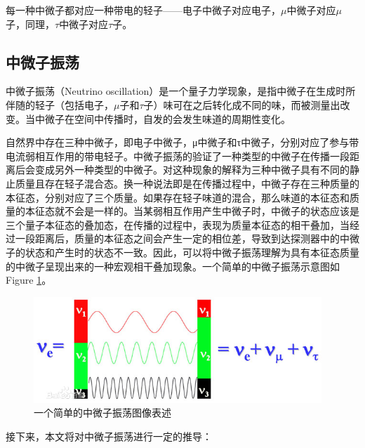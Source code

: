 \documentclass[10pt,a4paper]{article}
\begin{document}
每一种中微子都对应一种带电的轻子——电子中微子对应电子，$\mu$中微子对应$\mu$子，同理，$\tau$中微子对应$\tau$子。

\newpage

\subsection{中微子振荡}\label{sub:sysover}


中微子振荡（Neutrino oscillation）是一个量子力学现象，是指中微子在生成时所伴随的轻子（包括电子，$\mu$子和$\tau$子）味可在之后转化成不同的味，而被测量出改变。当中微子在空间中传播时，自发的会发生味道的周期性变化。

自然界中存在三种中微子，即电子中微子，μ中微子和τ中微子，分别对应了参与带电流弱相互作用的带电轻子。中微子振荡的验证了一种类型的中微子在传播一段距离后会变成另外一种类型的中微子。对这种现象的解释为三种中微子具有不同的静止质量且存在轻子混合态。换一种说法即是在传播过程中，中微子存在三种质量的本征态，分别对应了三个质量。如果存在轻子味道的混合，那么味道的本征态和质量的本征态就不会是一样的。当某弱相互作用产生中微子时，中微子的状态应该是三个量子本征态的叠加态，在传播的过程中，表现为质量本征态的相干叠加，当经过一段距离后，质量的本征态之间会产生一定的相位差，导致到达探测器中的中微子的状态和产生时的状态不一致。因此，可以将中微子振荡理解为具有本征态质量的中微子呈现出来的一种宏观相干叠加现象。一个简单的中微子振荡示意图如Figure \ref{fig:10}。


\begin{figure}[H]
 \centering
 \includegraphics[height=4cm]{images/中微子振荡示意图.jpg}
 \caption{一个简单的中微子振荡图像表述\cite{pic1}}
 \label{fig:10}
\end{figure}

接下来，本文将对中微子振荡进行一定的推导\cite{2007fun}\cite{2016Neutrino}\cite{2019Physics}：
\end{document}
